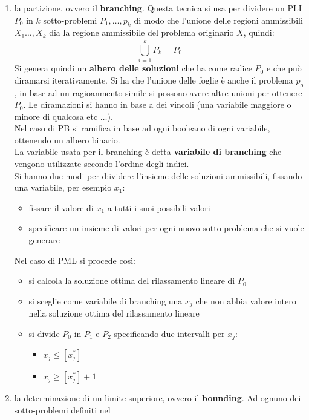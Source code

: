 \documentclass[a4paper,12pt, oneside]{book}
\begin{document}
\begin{enumerate}
  \item la partizione, ovvero il \textbf{branching}. Questa tecnica si
  usa per dividere un PLI $P_0$ in $k$ sotto-problemi $P_1,\ldots,
  p_k$ di modo che l'unione delle regioni ammissibili $X_1\ldots, X_k$
  dia la regione ammissibile del problema originario $X$, quindi:
  \[\bigcup_{i=1}^kP_k=P_0\]
  Si genera quindi un \textbf{albero delle soluzioni} che ha come
  radice $P_0$ e che può diramarsi iterativamente. Si ha che l'unione
  delle foglie è anche il problema $p_o$, in base ad un ragioanmento
  simile si possono avere altre unioni per ottenere $P_0$. Le
  diramazioni si hanno in base a dei vincoli (una variabile maggiore o
  minore di qualcosa etc $\ldots$).\\
  Nel caso di PB si ramifica in base ad ogni booleano di ogni
  variabile, ottenendo un albero binario.\\
  La variabile usata per il branching è detta \textbf{variabile di
    branching} che vengono utilizzate secondo l'ordine degli indici.\\
  Si hanno due modi per d:ividere l'insieme delle soluzioni
  ammissibili, fissando una variabile, per esempio $x_1$:
  \begin{itemize}
    \item fissare il valore di $x_1$ a tutti i suoi possibili valori
    \item specificare un insieme di valori per ogni nuovo sotto-problema
    che si vuole generare
  \end{itemize}
  Nel caso di PML si procede così:
  \begin{itemize}
    \item si calcola la soluzione ottima del rilassamento lineare di
    $P_0$
    \item si sceglie come variabile di branching una $x_j$ che non
    abbia valore intero nella soluzione ottima del rilassamento
    lineare
    \item si divide $P_0$ in $P_1$ e $P_2$ specificando due intervalli
    per $x_j$:
    \begin{itemize}
      \item $x_j\leq [x_j^*]$
      \item $x_j\geq [x_j^*]+1$
    \end{itemize}
  \end{itemize}
  \item la determinazione di un limite superiore, ovvero il
  \textbf{bounding}. Ad ognuno dei sotto-problemi definiti nel

\end{enumerate}
\end{document}
